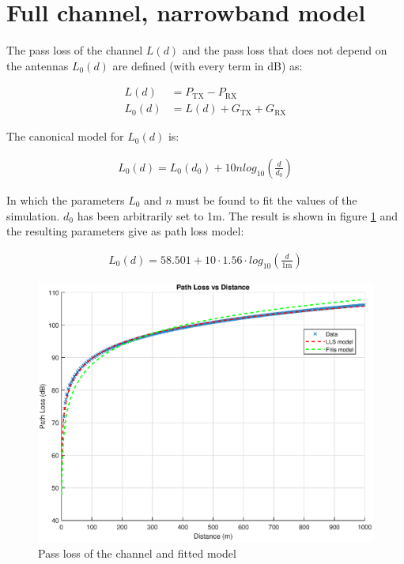 \documentclass[10pt,a4paper]{ULBreport}
\begin{document}
\section{Full channel, narrowband model}

The pass loss of the channel $L(d)$ and the pass loss that does not depend on the antennas $L_0(d)$ are defined (with every term in dB) as:


\begin{subequations}
    \label{eq:pass_loss}
    \begin{align}
        L(d) &= P_{\text{TX}} - P_{\text{RX}}\\
        L_0(d) &= L(d) + G_{\text{TX}} + G_{\text{RX}}
    \end{align}
\end{subequations}

The canonical model for $L_0(d)$ is:

\begin{align*}
    L_0(d) = L_0(d_0) + 10 n log_{10} \left(\frac{d}{d_0}\right)
\end{align*}

In which the parameters $L_0$ and $n$ must be found to fit the values of the simulation. $d_0$ has been arbitrarily set to 1m. The result is shown in figure \ref{fig:pass_loss} and the resulting parameters give as path loss model:

\begin{align}
    \label{eq:pass_loss_model}
    L_0(d) = 58.501 + 10 \cdot 1.56 \cdot log_{10} \left(\frac{d}{1\text{m}}\right)
\end{align}

\begin{figure}[H]
    \centering
    \includegraphics[width=1\textwidth]{3_5_model.eps}
    \caption{Pass loss of the channel and fitted model}
    \label{fig:pass_loss}
\end{figure}
\end{document}
